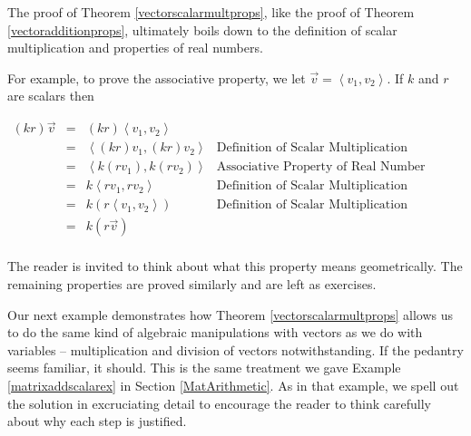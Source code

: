 \documentclass{ximera}
\begin{document}
The proof of Theorem \ref{vectorscalarmultprops}, like the proof of Theorem \ref{vectoradditionprops}, ultimately boils down to the definition of scalar multiplication and properties of real numbers.  

 

For example, to prove the associative property, we let $\overrightarrow{v} = \left<v_1,v_2\right>$.  If $k$ and $r$ are scalars then 

\[\begin{array}{rcll}

(kr) \overrightarrow{v} & = & (kr) \left<v_1,v_2\right> & \\   
						 & = &  \left<(kr) v_1, (kr) v_2\right> & \text{Definition of Scalar Multiplication} \\   
						 & = &   \left<k (r v_1),  k (r v_2)\right> & \text{Associative Property of Real Number Multiplication} \\   
						 & = &   k\left<r v_1,  r v_2\right> & \text{Definition of Scalar Multiplication} \\   	
 						 & = &   k\left(r\left<v_1, v_2\right>\right) & \text{Definition of Scalar Multiplication} \\   
						 & = & k(r\overrightarrow{v}) & \\ \end{array} \]
						 
The reader is invited to think about what this property means geometrically.  The remaining properties are proved similarly and are left as exercises.

 

Our next example demonstrates how Theorem \ref{vectorscalarmultprops} allows us to do the same kind of algebraic manipulations with vectors as we do with variables -- multiplication and division of vectors notwithstanding.  If the pedantry seems familiar, it should.  This is the same treatment we gave Example \ref{matrixaddscalarex} in Section \ref{MatArithmetic}.  As in that example,  we spell out the solution in excruciating detail to encourage the reader to think carefully about why each step is justified.
\end{document}
